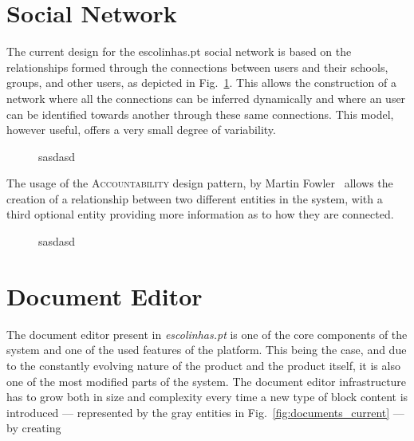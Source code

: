 \documentclass[9pt,a4paper]{extarticle}
\begin{document}
\begin{multicols}{2}
\section{Social Network}\label{sec:social_network}

The current design for the escolinhas.pt social network is based on the relationships formed through the connections between users and their schools, groups, and other users, as depicted in Fig.~\ref{fig:social_network_current}. This allows the construction of a network where all the connections can be inferred dynamically and where an user can be identified towards another through these same connections. This model, however useful, offers a very small degree of variability.

\begin{figure}[H]
  \caption{sasdasd}
  \label{fig:social_network_current}
\end{figure}

The usage of the \textsc{Accountability} design pattern, by Martin Fowler~\cite{fowler_accountability} allows the creation of a relationship between two different entities in the system, with a third optional entity providing more information as to how they are connected.

\begin{figure}[H]
  \caption{sasdasd}
  \label{fig:social_network_conceptual}
\end{figure}

\section{Document Editor}\label{sec:document_editor}

The document editor present in \emph{escolinhas.pt} is one of the core components of the system and one of the used features of the platform. This being the case, and due to the constantly evolving nature of the product and the product itself, it is also one of the most modified parts of the system. The document editor infrastructure has to grow both in size and complexity every time a new type of block content is introduced --- represented by the gray entities in Fig.~\ref{fig:documents_current} --- by creating 


\end{multicols}
\end{document}
